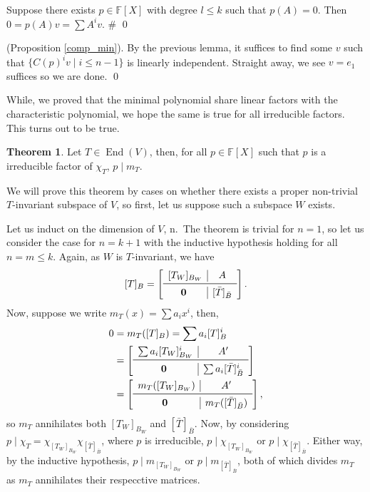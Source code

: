 \documentclass[
]{article}
\theoremstyle{definition}
\newtheorem{theorem}{Theorem}
\theoremstyle{definition}
\begin{document}
Suppose there exists \(p \in \mathbb{F}[X]\) with degree \(l \le k\)
such that \(p(A) = 0\). Then \(0 = p(A)v = \sum A^i v\). \# \qed

\proof

(Proposition \ref{comp_min}). By the previous lemma, it suffices to find
some \(v\) such that \(\{C(p)^i v \mid i \le n - 1\}\) is linearly
independent. Straight away, we see \(v = e_1\) suffices so we are done.
\qed

While, we proved that the minimal polynomial share linear factors with
the characteristic polynomial, we hope the same is true for all
irreducible factors. This turns out to be true.

\begin{theorem}
  Let \(T \in \mathop{\mathrm{End}}(V)\), then, for all \(p \in \mathbb{F}[X]\) such that 
  \(p\) is a irreducible factor of \(\chi_T\), \(p \mid m_T\).
\end{theorem}
\proof

We will prove this theorem by cases on whether there exists a proper
non-trivial \(T\)-invariant subspace of \(V\), so first, let us suppose
such a subspace \(W\) exists.

Let us induct on the dimension of \(V\), n.~The theorem is trivial for
\(n = 1\), so let us consider the case for \(n = k + 1\) with the
inductive hypothesis holding for all \(n = m \le k\). Again, as \(W\) is
\(T\)-invariant, we have \[[T]_B = 
    \left[
      \begin{array}{c|c}
        [T_W]_{B_W} & A \\
        \midrule
        \mathbf{0} & [\bar{T}]_{\bar{B}}
      \end{array}
      \right]. \] Now, suppose we write \(m_T(x) = \sum a_i x^i\), then,
\begin{align*}
    0 & = m_T([T]_B) = \sum a_i [T]_B^i \\
      & = \left[
          \begin{array}{c|c}
            \sum a_i [T_W]_{B_W}^i & A' \\
            \midrule
            \mathbf{0} & \sum a_i [\bar{T}]_{\bar{B}}^i
          \end{array}
          \right] \\
      & = \left[
          \begin{array}{c|c}
            m_T([T_W]_{B_W}) & A' \\
            \midrule
            \mathbf{0} & m_T([\bar{T}]_{\bar{B}})
          \end{array}
          \right],
  \end{align*} so \(m_T\) annihilates both \([T_W]_{B_W}\) and
\([\bar{T}]_{\bar{B}}\). Now, by considering
\(p \mid \chi_T = \chi_{[T_W]_{B_W}} \chi_{[\bar{T}]_{\bar{B}}}\), where
\(p\) is irreducible, \(p \mid \chi_{[T_W]_{B_W}}\) or
\(p \mid \chi_{[\bar{T}]_{\bar{B}}}\). Either way, by the inductive
hypothesis, \(p \mid m_{[T_W]_{B_W}}\) or
\(p \mid m_{[\bar{T}]_{\bar{B}}}\), both of which divides \(m_T\) as
\(m_T\) annihilates their respecctive matrices.
\end{document}
